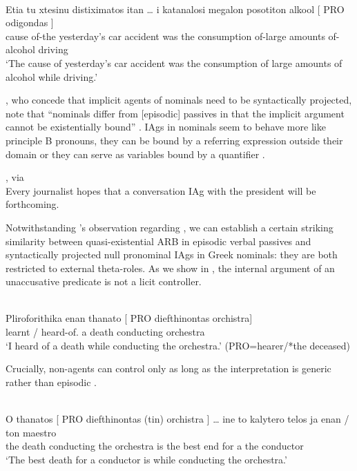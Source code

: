 \documentclass[output=paper]{langsci/langscibook}
\begin{document}
\ea%
    \label{ex:22.28}\\
    \gll    Etia  tu  xtesinu  distiximatos  itan \dots{} i  katanalosi megalon  posotiton  alkool    [ PRO  odigondas ]\\
            cause   of-the  yesterday’s  {car accident}  was {} the  consumption of-large  amounts  of-alcohol {} {} driving\\
    \glt    \enquote*{The cause of yesterday's car accident was the consumption
    of large amounts of alcohol while driving.}
\z

\citet{AlexiadouEtAl2015}, who concede that implicit agents of nominals need to
be syntactically projected, note that “nominals differ from [episodic] passives
in that the implicit argument cannot be existentially bound”
\parencite[238]{AlexiadouEtAl2015}. \glspl{IAg} in nominals seem to behave more
like principle B pronouns, they can be bound by a referring expression outside
their  domain or they can serve as variables bound by a quantifier
.

\ea%
    \label{ex:22.29} \textcite{Bruening2014}, via
    \textcite[238]{AlexiadouEtAl2015}\\
    Every journalist hopes that a conversation
    \gls{IAg} with the president will be forthcoming.
\z

Notwithstanding \citeauthor{AlexiadouEtAl2015}'s observation regarding , we
can establish a certain striking similarity between quasi-existential ARB in
episodic verbal passives and syntactically projected null pronominal \glspl{IAg} in
Greek nominals: they are both restricted to external theta-roles. As we show in
, the internal argument of an unaccusative predicate is not a
licit controller.

\ea\label{ex:22.30} \\
    \gll    Pliroforithika      enan thanato [ PRO diefthinontas orchistra]\\
            {learnt / heard-of.\Fsg} a  death {} {}     conducting
            orchestra\\
    \glt    \enquote*{I heard of a death while conducting the orchestra.} (PRO=hearer/*the deceased)
\z

Crucially, non-agents can control only as long as the interpretation is generic
rather than episodic .

\ea%
    \label{ex:22.31} \\
    \gll    O     thanatos   [ PRO diefthinontas (tin) orchistra ] \dots{} ine to   kalytero  telos  ja  enan / ton  maestro\\
            the  death {} {} conducting the  orchestra {} {} is  the best  end for  a  {} the  conductor\\
    \glt    \enquote*{The best death for a conductor is while conducting the orchestra.}
\z
\end{document}
